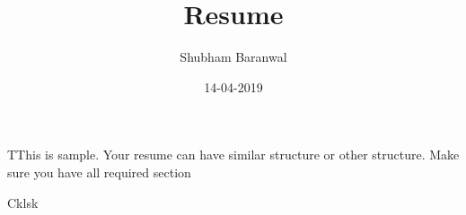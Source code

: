 \documentclass{article}
\title{Resume}
\date{14-04-2019}
\author{Shubham Baranwal}
\begin{document}
	\begin{title}
TThis is sample. Your resume can have similar structure or other structure. Make sure you have all required section
	\end{title}
	\begin{center}
		Cklsk
	\end{center}
\hrulefill
\begin{figure}[h!]
\end{figure}
\end{document}
